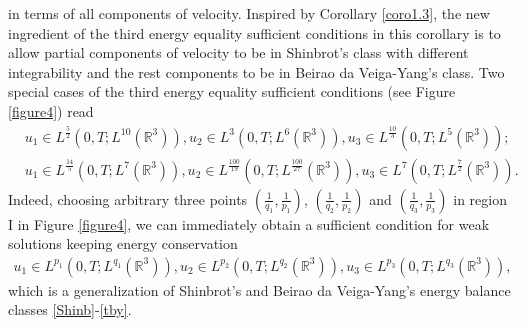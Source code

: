 \documentclass[11pt]{article}
\theoremstyle{plain}\newtheorem{definition}{Definition}[section]
\theoremstyle{definition}\newtheorem{theorem}{Theorem}[section]
\theoremstyle{plain}\newtheorem{lemma}[theorem]{Lemma}
\theoremstyle{plain}\newtheorem{coro}[theorem]{Corollary}
\theoremstyle{plain}\newtheorem{prop}[theorem]{Proposition}
\theoremstyle{remark}\newtheorem{remark}{Remark}[section]
\newcommand{\be}{\begin{equation}}
\newcommand{\ee}{\end{equation}}
\newcommand{\ba}{\begin{aligned}}
\newcommand{\ea}{\end{aligned}}
\newcommand{\f}{\frac}
\numberwithin{equation}{section}
\begin{document}
in terms of all components of velocity. Inspired by Corollary \ref{coro1.3}, the new ingredient of the third energy equality sufficient conditions in this corollary is to allow partial components of velocity to be in Shinbrot's class with different
integrability and the rest components to be in Beirao da Veiga-Yang's class.
 Two special cases of the third energy equality sufficient conditions (see Figure \ref{figure4}) read
\be\ba &u_1 \in L^{ \f52}(0,T;L^{10} (\mathbb{R}^{3})) ,
 u_2\in L^{ 3}(0,T;L^{6} (\mathbb{R}^{3})),  u_3 \in L^{ \f{10}{3}}(0,T;L^{5} (\mathbb{R}^{3}));\\
 &u_1 \in L^{ \f{14}{5}}(0,T;L^{7} (\mathbb{R}^{3})),
 u_2\in L^{\f{100}{19}}(0,T;L^{\f{100}{27} } (\mathbb{R}^{3})),  u_3 \in L^{ 7}(0,T;L^{\f72} (\mathbb{R}^{3})).
\ea\ee
Indeed, choosing arbitrary three points  $(\f{1}{q_{1}},\f{1}{p_{1}})$, $(\f{1}{q_{2}},\f{1}{p_{2}})$   and  $(\f{1}{q_{3}},\f{1}{p_{3}})$   in region I in Figure \ref{figure4}, we can immediately obtain a sufficient condition for weak solutions keeping energy conservation
\be\ba
u_1 \in L^{ p_{1}}(0,T;L^{q_{1}} (\mathbb{R}^{3})),
 u_2\in L^{ p_{2}}(0,T;L^{q_{2}} (\mathbb{R}^{3})),  u_3 \in L^{ p_{3}}(0,T;L^{q_{3}} (\mathbb{R}^{3})),
\ea\ee
 which is a generalization of Shinbrot's and  Beirao da Veiga-Yang's energy balance classes \eqref{Shinb}-\eqref{tby}.
\end{document}
